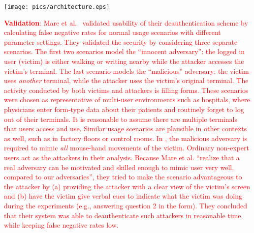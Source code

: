 \documentclass[conference]{IEEEtran}
\newcommand{\zebra}{ZEBRA\xspace}
\newcommand\changeMika[1]{\textcolor{red}{#1}}
\newcommand\changeAsokan[1]{\textcolor{red}{#1}}
\newcommand\changeMika[1]{{#1}}
\newcommand\changeAsokan[1]{{#1}}
\begin{document}
\begin{figure*}[!htb]
\centering
\vspace{-8mm}
\texttt{[image: pics/architecture.eps]}
\vspace{-20mm}
\caption{\zebra system architecture}
\label{fig:architecture}
\vspace{-5mm}
\end{figure*}

\vspace{1mm}
\noindent\changeMika{\textbf{Validation}: Mare et al.~\cite{mare2014zebra} validated usability of their deauthentication scheme by calculating false negative rates for normal usage scenarios with different parameter settings. They validated the security by considering three separate scenarios.} \changeAsokan{The first two scenarios model the ``innocent adversary'':} \changeMika{the logged in user (victim) is either walking or writing nearby while the} \changeAsokan{attacker accesses the victim's terminal. The last scenario models the ``malicious'' adversary: the victim uses} \changeMika{\emph{another} terminal, while the} \changeAsokan{attacker uses the victim's original terminal. The activity conducted by both victims and attackers is filling forms. These scenarios were chosen as representative of} \changeMika{multi-user environments such as hospitals, where physicians enter form-type data about their patients and routinely forget to log out of their terminals. 
It is reasonable to assume there are multiple terminals that} \changeAsokan{users access and use.}
\changeMika{Similar usage scenarios are plausible in other contexts as well, such as in factory floors or control rooms. In \cite{mare2014zebra}, the} \changeAsokan{malicious adversary is required} \changeMika{to mimic \emph{all} mouse-hand movements of the victim. Ordinary non-expert users act as the attackers in their analysis.} \changeAsokan{Because Mare et al. \cite{mare2014zebra}} \changeMika{``realize that a real adversary can be motivated and skilled enough to mimic user very well, compared to our adversaries'',} \changeAsokan{they tried to make the scenario advantageous to the attacker by (a) providing the attacker with a clear view of the victim's screen and (b) have the victim give verbal cues to indicate what the victim was doing during the experiments (e.g., answering question 2 in the form).} 
\changeMika{They concluded that their system was able to deauthenticate such attackers in reasonable time, while keeping false negative rates low. 
}
\end{document}
